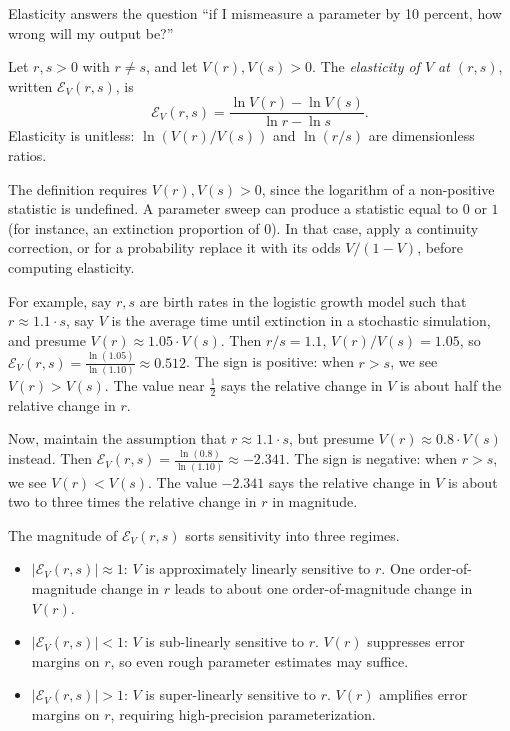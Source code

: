 Elasticity answers the question ``if I mismeasure a parameter by 10 percent, how wrong will my output be?''

\begin{definition}[Elasticity of $V$]\label{def:elasticity}
Let $r, s > 0$ with $r \neq s$, and let $V(r), V(s) > 0$. The \textit{elasticity of $V$ at $(r,s)$}, written $\mathcal{E}_{V}(r,s)$, is
\[\mathcal{E}_{V}(r,s) = \frac{\ln V(r) - \ln V(s)}{\ln r - \ln s}.\]
Elasticity is unitless: $\ln(V(r)/V(s))$ and $\ln(r/s)$ are dimensionless ratios.
\end{definition}

The definition requires $V(r), V(s) > 0$, since the logarithm of a non-positive statistic is undefined. A parameter sweep can produce a statistic equal to $0$ or $1$ (for instance, an extinction proportion of $0$). In that case, apply a continuity correction, or for a probability replace it with its odds $V/(1-V)$, before computing elasticity.

For example, say $r, s$ are birth rates in the logistic growth model such that $r \approx 1.1 \cdot s$, say $V$ is the average time until extinction in a stochastic simulation, and presume $V(r) \approx 1.05 \cdot V(s)$. Then $r/s = 1.1$, $V(r)/V(s) = 1.05$, so $\mathcal{E}_{V}(r,s) = \frac{\ln(1.05)}{\ln(1.10)} \approx 0.512$. The sign is positive: when $r > s$, we see $V(r) > V(s)$. The value near $\frac{1}{2}$ says the relative change in $V$ is about half the relative change in $r$.

Now, maintain the assumption that $r \approx 1.1 \cdot s$, but presume $V(r) \approx 0.8 \cdot V(s)$ instead. Then $\mathcal{E}_{V}(r,s) = \frac{\ln(0.8)}{\ln(1.10)} \approx -2.341$. The sign is negative: when $r > s$, we see $V(r) < V(s)$. The value $-2.341$ says the relative change in $V$ is about two to three times the relative change in $r$ in magnitude.

The magnitude of $\mathcal{E}_{V}(r,s)$ sorts sensitivity into three regimes.
\begin{itemize}
\item $\left|\mathcal{E}_{V}(r,s)\right| \approx 1$: $V$ is approximately linearly sensitive to $r$. One order-of-magnitude change in $r$ leads to about one order-of-magnitude change in $V(r)$.
\item $\left|\mathcal{E}_{V}(r,s)\right| < 1$: $V$ is sub-linearly sensitive to $r$. $V(r)$ suppresses error margins on $r$, so even rough parameter estimates may suffice.
\item $\left|\mathcal{E}_{V}(r,s)\right| > 1$: $V$ is super-linearly sensitive to $r$. $V(r)$ amplifies error margins on $r$, requiring high-precision parameterization.
\end{itemize}

